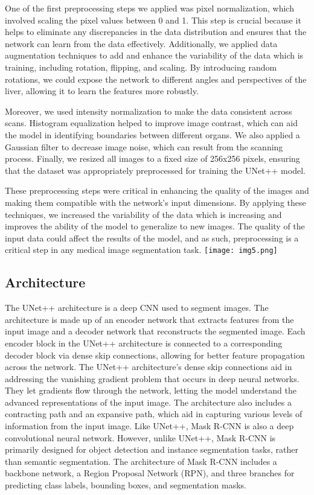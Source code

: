 \documentclass[conference]{IEEEtran}
\begin{document}
One of the first preprocessing steps we applied was pixel normalization, which involved scaling the pixel values between 0 and 1. This step is crucial because it helps to eliminate any discrepancies in the data distribution and ensures that the network can learn from the data effectively. Additionally, we applied data augmentation techniques to add and enhance the variability of the data which is training, including rotation, flipping, and scaling. By introducing random rotations, we could expose the network to different angles and perspectives of the liver, allowing it to learn the features more robustly.

Moreover, we used intensity normalization to make the data consistent across scans. Histogram equalization helped to improve image contrast, which can aid the model in identifying boundaries between different organs. We also applied a Gaussian filter to decrease image noise, which can result from the scanning process. Finally, we resized all images to a fixed size of 256x256 pixels, ensuring that the dataset was appropriately preprocessed for training the UNet++ model.

These preprocessing steps were critical in enhancing the quality of the images and making them compatible with the network’s input dimensions. By applying these techniques, we increased the variability of the data which is increasing and improves the ability of the model to generalize to new images. The quality of the input data could affect the results of the model, and as such, preprocessing is a critical step in any medical image segmentation task.
\texttt{[image: img5.png]}
\subsection{ Architecture}\label{SCM}
The UNet++ architecture is a deep CNN used to segment images. The architecture is made up of an encoder network that extracts features from the input image and a decoder network that reconstructs the segmented image. Each encoder block in the UNet++ architecture is connected to a corresponding decoder block via dense skip connections, allowing for better feature propagation across the network.
The UNet++ architecture's dense skip connections aid in addressing the vanishing gradient problem that occurs in deep neural networks. They let gradients flow through the network, letting the model understand the advanced representations of the input image. The architecture also includes a contracting path and an expansive path, which aid in capturing various levels of information from the input image.
Like UNet++, Mask R-CNN is also a deep convolutional neural network. However, unlike UNet++, Mask R-CNN is primarily designed for object detection and instance segmentation tasks, rather than semantic segmentation. The architecture of Mask R-CNN includes a backbone network, a Region Proposal Network (RPN), and three branches for predicting class labels, bounding boxes, and segmentation masks.
\end{document}
